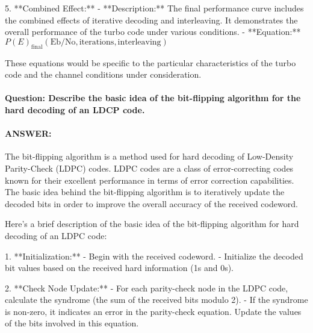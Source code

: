 \documentclass[colorlinks,11pt,a4paper,normalphoto,withhyper,ragged2e]{altareport}
\begin{document}
				5. **Combined Effect:**
				- **Description:** The final performance curve includes the combined effects of iterative decoding and interleaving. It demonstrates the overall performance of the turbo code under various conditions.
				- **Equation:** \(P(E)_{\text{final}}(\text{Eb/No}, \text{iterations}, \text{interleaving})\)
				
%				
%				
%				
%				
%				
				
				These equations would be specific to the particular characteristics of the turbo code and the channel conditions under consideration.
				
				
				
				
				
				\paragraph{Question: Describe the basic idea of the bit-flipping algorithm for the hard decoding of an LDCP code.}
				\paragraph{ANSWER:}
				The bit-flipping algorithm is a method used for hard decoding of Low-Density Parity-Check (LDPC) codes. LDPC codes are a class of error-correcting codes known for their excellent performance in terms of error correction capabilities. The basic idea behind the bit-flipping algorithm is to iteratively update the decoded bits in order to improve the overall accuracy of the received codeword.
				
				Here's a brief description of the basic idea of the bit-flipping algorithm for hard decoding of an LDPC code:
				
				1. **Initialization:**
				- Begin with the received codeword.
				- Initialize the decoded bit values based on the received hard information (1s and 0s).
				
				2. **Check Node Update:**
				- For each parity-check node in the LDPC code, calculate the syndrome (the sum of the received bits modulo 2).
				- If the syndrome is non-zero, it indicates an error in the parity-check equation. Update the values of the bits involved in this equation.
				
\end{document}
